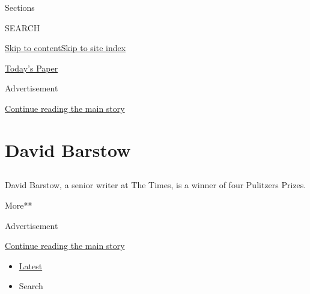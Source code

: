 Sections

SEARCH

\protect\hyperlink{site-content}{Skip to
content}\protect\hyperlink{site-index}{Skip to site index}

\href{https://myaccount.nytimes.com/auth/login?response_type=cookie\&client_id=vi}{}

\href{https://www.nytimes.com/section/todayspaper}{Today's Paper}

Advertisement

\protect\hyperlink{after-top}{Continue reading the main story}

\hypertarget{david-barstow}{%
\section{David Barstow}\label{david-barstow}}

\subsection{}

David Barstow, a senior writer at The Times, is a winner of four
Pulitzers Prizes.

More**

Advertisement

\protect\hyperlink{after-mid1}{Continue reading the main story}

\begin{itemize}
\tightlist
\item
  \protect\hyperlink{stream-panel}{Latest}
\item
  Search
\end{itemize}

